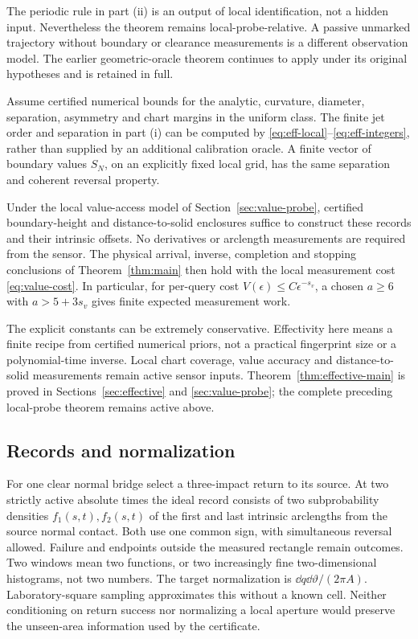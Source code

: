 The periodic rule in part (ii) is an output of local identification,
not a hidden input. Nevertheless the theorem remains local-probe-relative.
A passive unmarked trajectory without boundary or clearance measurements
is a different observation model. The earlier geometric-oracle theorem
continues to apply under its original hypotheses and is retained in full.

\begin{theorem}
\label{thm:effective-main}
Assume certified numerical bounds for the analytic, curvature, diameter,
separation, asymmetry and chart margins in the uniform class. The finite
jet order and separation in part (i) can be computed by
\eqref{eq:eff-local}--\eqref{eq:eff-integers}, rather than supplied by
an additional calibration oracle. A finite vector of boundary values
$S_N$, on an explicitly fixed local grid, has the same separation and
coherent reversal property.

Under the local value-access model of Section~\ref{sec:value-probe},
certified boundary-height and distance-to-solid enclosures suffice to
construct these records and their intrinsic offsets. No derivatives or
arclength measurements are required from the sensor. The physical
arrival, inverse, completion and stopping conclusions of
Theorem~\ref{thm:main} then hold with the local measurement cost
\eqref{eq:value-cost}. In particular, for per-query cost
$V(\epsilon)\le C\epsilon^{-s_v}$, a chosen
$a\ge6$ with $a>5+3s_v$ gives finite expected measurement work.
\end{theorem}

The explicit constants can be extremely conservative. Effectivity here
means a finite recipe from certified numerical priors, not a practical
fingerprint size or a polynomial-time inverse. Local chart coverage,
value accuracy and distance-to-solid measurements remain active sensor
inputs. Theorem~\ref{thm:effective-main} is proved in
Sections~\ref{sec:effective} and \ref{sec:value-probe}; the complete
preceding local-probe theorem remains active above.

\subsection{Records and normalization}
For one clear normal bridge select a three-impact return to its source.
At two strictly active absolute times the ideal record consists of two
subprobability densities $f_1(s,t),f_2(s,t)$ of the first and last
intrinsic arclengths from the source normal contact. Both use one common
sign, with simultaneous reversal allowed. Failure and endpoints outside
the measured rectangle remain outcomes. Two windows mean two functions,
or two increasingly fine two-dimensional histograms, not two numbers.
The target normalization is $\dd q\dd\vartheta/(2\pi A)$.
Laboratory-square sampling approximates this without a known cell.
Neither conditioning on return success nor normalizing a local aperture
would preserve the unseen-area information used by the certificate.

